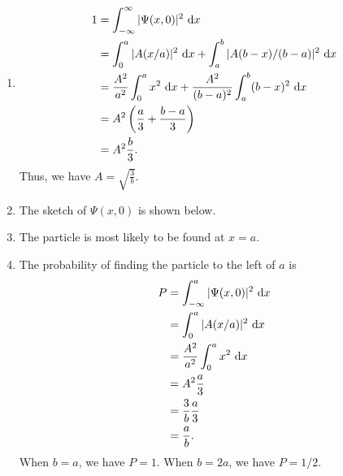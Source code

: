 \documentclass[en, oneside]{vivi}
\begin{document}
\begin{sol}
    \begin{enumerate}[label=(\alph*)]
        \item \begin{align*}
            1 &= \int_{-\infty}^{\infty} |\Psi (x, 0)|^2 \dif x\\
            &= \int_{0}^{a} |A (x/a)|^2 \dif x + \int_{a}^{b} |A (b - x)/(b - a)|^2 \dif x\\
            &= \frac{A^2}{a^2} \int_{0}^{a} x^2 \dif x + \frac{A^2}{(b - a)^2} \int_{a}^{b} (b - x)^2 \dif x\\
            &= A^2 \left( \frac{a}{3} + \frac{b - a}{3} \right)\\
            &= A^2 \frac{b}{3}.
        \end{align*}
        Thus, we have $A = \sqrt{\frac{3}{b}}$.
        \item The sketch of $\Psi (x, 0)$ is shown below.
        \begin{center}
        \end{center}
        \item The particle is most likely to be found at $x = a$.
        \item The probability of finding the particle to the left of $a$ is
        \begin{align*}
            P &= \int_{-\infty}^{a} |\Psi (x, 0)|^2 \dif x\\
            &= \int_{0}^{a} |A (x/a)|^2 \dif x\\
            &= \frac{A^2}{a^2} \int_{0}^{a} x^2 \dif x\\
            &= A^2 \frac{a}{3}\\
            &= \frac{3}{b} \frac{a}{3}\\
            &= \frac{a}{b}.
        \end{align*}
        When $b = a$, we have $P = 1$. When $b = 2a$, we have $P = 1/2$.

\end{enumerate}
\end{sol}
\end{document}
